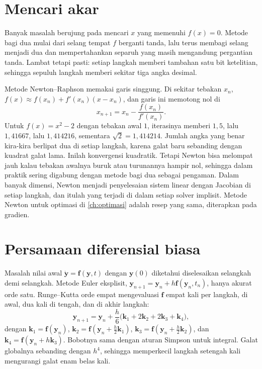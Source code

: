 \section{Mencari akar}

Banyak masalah berujung pada mencari $x$ yang memenuhi $f(x)=0$. Metode bagi dua mulai dari selang tempat $f$
berganti tanda, lalu terus membagi selang menjadi dua dan mempertahankan separuh yang masih mengandung
pergantian tanda. Lambat tetapi pasti: setiap langkah memberi tambahan satu bit ketelitian, sehingga sepuluh
langkah memberi sekitar tiga angka desimal.

Metode Newton--Raphson memakai garis singgung. Di sekitar tebakan $x_n$, $f(x)\approx f(x_n)+f'(x_n)(x-x_n)$,
dan garis ini memotong nol di
\begin{equation}
x_{n+1}=x_n-\frac{f(x_n)}{f'(x_n)}.
\end{equation}
Untuk $f(x)=x^2-2$ dengan tebakan awal $1$, iterasinya memberi $1{,}5$, lalu $1{,}41667$, lalu $1{,}414216$,
sementara $\sqrt2=1{,}414214$. Jumlah angka yang benar kira-kira berlipat dua di setiap langkah, karena
galat baru sebanding dengan kuadrat galat lama. Inilah konvergensi kuadratik. Tetapi Newton bisa melompat
jauh kalau tebakan awalnya buruk atau turunannya hampir nol, sehingga dalam praktik sering digabung dengan
metode bagi dua sebagai pengaman. Dalam banyak dimensi, Newton menjadi penyelesaian sistem linear dengan
Jacobian di setiap langkah, dan itulah yang terjadi di dalam setiap solver implisit. Metode Newton untuk
optimasi di \cref{ch:optimasi} adalah resep yang sama, diterapkan pada gradien.

\section{Persamaan diferensial biasa}

Masalah nilai awal $\dot{\bm y}=\bm f(\bm y,t)$ dengan $\bm y(0)$ diketahui diselesaikan selangkah demi
selangkah. Metode Euler eksplisit, $\bm y_{n+1}=\bm y_n+h\bm f(\bm y_n,t_n)$, hanya akurat orde satu. Runge--Kutta
orde empat mengevaluasi $\bm f$ empat kali per langkah, di awal, dua kali di tengah, dan di akhir langkah:
\begin{equation}
\bm y_{n+1}=\bm y_n+\frac h6\big(\bm k_1+2\bm k_2+2\bm k_3+\bm k_4\big),
\end{equation}
dengan $\bm k_1=\bm f(\bm y_n)$, $\bm k_2=\bm f(\bm y_n+\tfrac h2\bm k_1)$, $\bm k_3=\bm f(\bm y_n+\tfrac h2\bm k_2)$, dan
$\bm k_4=\bm f(\bm y_n+h\bm k_3)$. Bobotnya sama dengan aturan Simpson untuk integral. Galat globalnya
sebanding dengan $h^4$, sehingga memperkecil langkah setengah kali mengurangi galat enam belas kali.

